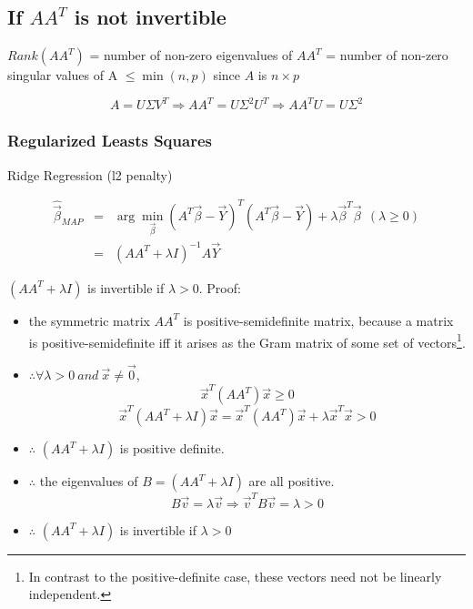 \documentclass[letterpaper,10pt]{article}
\begin{document}
\subsection{If $AA^T$ is not invertible}

$Rank(AA^T)$ = number of non-zero eigenvalues of $AA^T$ = number of non-zero singular values of A $\leq \min(n,p)$ since $A$ is $n\times p$

$$A=U \Sigma V^T \Rightarrow AA^T=U\Sigma^2U^T \Rightarrow AA^T U = U\Sigma^2$$

\subsubsection{Regularized Leasts Squares}

Ridge Regression (l2 penalty)

\begin{equation}
\begin{array}{rcl}
\hat{\vec{\beta}}_{MAP} & = & \arg\min_{\vec{\beta}}(A^T\vec{\beta}-\vec{Y})^T(A^T\vec{\beta}-\vec{Y}) +\lambda \vec{\beta}^T\vec{\beta}~~(\lambda \geq 0) \\
& = & (AA^T + \lambda I)^{-1} A\vec{Y}
\end{array}
\end{equation}

$(AA^T + \lambda I)$ is invertible if $\lambda > 0$. Proof:
\begin{itemize}
	\item the symmetric matrix $AA^T$ is positive-semidefinite matrix, because a matrix is positive-semidefinite iff it arises as the Gram matrix of some set of vectors\footnote{In contrast to the positive-definite case, these vectors need not be linearly independent.}.
	\item $\therefore \forall \lambda>0~and~\vec{x}\neq\vec{0}$, 
	$$\vec{x}^T(AA^T)\vec{x} \geq 0$$
	$$\vec{x}^T(AA^T+\lambda I)\vec{x} = \vec{x}^T (AA^T) \vec{x} + \lambda \vec{x}^T\vec{x} >0$$
	\item $\therefore$ $(AA^T+\lambda I)$ is positive definite.
	\item $\therefore$ the eigenvalues of $B=(AA^T+\lambda I)$ are all positive. $$B\vec{v}=\lambda\vec{v} \Rightarrow \vec{v}^T B \vec{v} = \lambda >0$$
	\item $\therefore$ $(AA^T + \lambda I)$ is invertible if $\lambda > 0$
\end{itemize}
\end{document}
